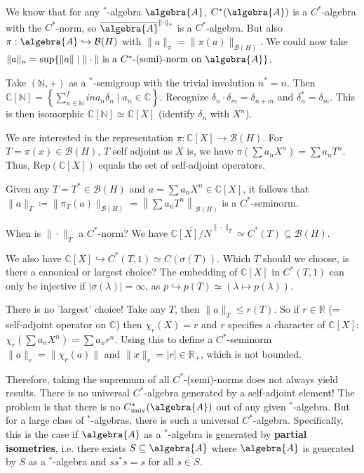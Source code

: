 \documentclass[a4paper]{article}
\begin{document}
\begin{remark}
	We know that for any $^*$-algebra $\algebra{A}$, $C^*(\algebra{A})$ is a $C^*$-algebra with the $C^*$-norm, so $\overline{\algebra{A}}^{\|\cdot\|_*}$ is a $C^*$-algebra.
	But also $\pi: \algebra{A} \hookrightarrow \mathcal{B}(H)$ with $\|a\|_\pi = \|\pi(a)\|_{\mathcal{B}(H)}$.
	We could now take $\|a\|_u = \sup \{ \|a\| \mid \|\cdot \| \text{ is a $C^*$-(semi)-norm on } \algebra{A} \}$.
\end{remark}

\begin{example}
	Take $(\mathds{N}, +)$ as a $^*$-semigroup with the trivial involution $n^* = n$.
	Then $\mathds{C}[\mathds{N}] = \left\{ \sum_{n \in \mathds{N}}^fin a_n \delta_n \mid a_n \in \mathds{C} \right\}$.
	Recognize $\delta_n \cdot \delta_m = \delta_{n + m}$ and $\delta_n^* = \delta_m$.
	This is then isomorphic $\mathds{C}[\mathds{N}] \simeq \mathds{C}[X]$ (identify $\delta_n$ with $X^n$).

	We are interested in the representation $\pi: \mathds{C}[X] \to \mathcal{B}(H)$.
	For $T = \pi(x) \in \mathcal{B}(H)$, $T$ self adjoint as $X$ is, we have $\pi(\sum a_n X^n) = \sum a_n T^n$.
	Thus, $\mathrm{Rep}(\mathds{C}[X])$ equals the set of self-adjoint operators.

	Given any $T = T^* \in \mathcal{B}(H)$ and $a = \sum a_n X^n \in \mathds{C}[X]$, it follows that $\|a\|_T \coloneq \|\pi_T(a)\|_{\mathcal{B}(H)} = \left\| \sum a_n T^n \right\|_{\mathcal{B}(H)}$ is a $C^*$-seminorm.

	When is $\|\cdot\|_T$ a $C^*$-norm? 
	We have $\overline{\mathds{C}[X] / N}^{\|\cdot\|_T} \simeq C^*(T) \subseteq \mathcal{B}(H)$.

	We also have $\mathds{C}[X] \hookrightarrow C^*(T,1) \simeq C(\sigma(T))$.
	Which $T$ should we choose, is there a canonical or largest choice?
	The embedding of $\mathds{C}[X]$ in $C^*(T,1)$ can only be injective if $|\sigma(\lambda)| = \infty$, as $p \hookrightarrow p(T) \simeq (\lambda \mapsto p(\lambda))$.

	There is no 'largest' choice!
	Take any $T$, then $\|a\|_T \leq r(T)$.
	So if $r \in \mathds{R}$ (= self-adjoint operator on $\mathds{C}$) then $\chi_r(X) = r$ and $r$ specifies a character of $\mathds{C}[X]$: $\chi_r(\sum a_n X^n) = \sum a_n r^n$.
	Using this to define a $C^*$-seminorm $\|a\|_r = \|\chi_r(a)\|$ and $\|x\|_r = |r| \in \mathds{R}_+$, which is not bounded.
	
	Therefore, taking the supremum of all $C^*$-(semi)-norms does not always yield results.
	There is no universal $C^*$-algebra generated by a self-adjoint element!
	The problem is that there is no $C^*_{\mathrm{univ}}(\algebra{A})$ out of any given $^*$-algebra.
	But for a large class of $^*$-algebras, there is such a universal $C^*$-algebra.
	Specifically, this is the case if $\algebra{A}$ as a $^*$-algebra is generated by \textbf{partial isometries}, i.e. there exists $S \subseteq \algebra{A}$ where $\algebra{A}$ is generated by $S$ as a $^*$-algebra and $s s^* s = s$ for all $s \in S$.


\end{example}
\end{document}

